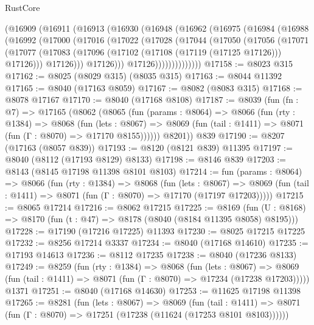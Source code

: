 \begin{lexlean}{RustCore}
\begin{coremodule}
      (@16909
        (@16911
          (@16913
            (@16930
              (@16948
                (@16962
                  (@16975
                    (@16984
                      (@16988
                        (@16992
                          (@17000
                            (@17016
                              (@17022
                                (@17028
                                  (@17044
                                    (@17050
                                      (@17056
                                        (@17071
                                          (@17077
                                            (@17083
                                              (@17096
                                                (@17102 (@17108 (@17119 (@17125 @17126))) @17126)))
                                            @17126)))
                                      @17126)))
                                @17126))))))))))))))
@17158 := @8023 @315
@17162 := @8025 (@8029 @315) (@8035 @315)
@17163 := @8044 @11392
@17165 := @8040 (@17163 @8059)
@17167 := @8082 (@8083 @315)
@17168 := @8078 @17167
@17170 := @8040 (@17168 @8108)
@17187 := @8039
    (fun (fn : @7) =>
    @17165
      (@8062
        (@8065
          (fun (params : @8064) =>
          @8066
            (fun (rty : @1384) =>
            @8068
              (fun (lets : @8067) =>
              @8069 (fun (tail : @1411) => @8071 (fun (Γ : @8070) => @17170 @8155))))))
        @8201))
    @839
@17190 := @8207 (@17163 (@8057 @839))
@17193 := @8120 (@8121 @839) @11395
@17197 := @8040 (@8112 (@17193 @8129) @8133)
@17198 := @8146 @839
@17203 := @8143 (@8145 @17198 @11398 @8101 @8103)
@17214 := fun (params : @8064) =>
  @8066
    (fun (rty : @1384) =>
    @8068
      (fun (lets : @8067) =>
      @8069 (fun (tail : @1411) => @8071 (fun (Γ : @8070) => @17170 (@17197 @17203)))))
@17215 := @8065 @17214
@17216 := @8062 @17215
@17225 := @8169
    (fun (U : @8168) => @8170 (fun (t : @47) => @8178 (@8040 (@8184 @11395 @8058) @8195)))
@17228 := @17190 (@17216 @17225) @11393
@17230 := @8025 @17215 @17225
@17232 := @8256 @17214 @3337
@17234 := @8040 (@17168 @14610)
@17235 := @17193 @14613
@17236 := @8112 @17235
@17238 := @8040 (@17236 @8133)
@17249 := @8259
    (fun (rty : @1384) =>
    @8068
      (fun (lets : @8067) =>
      @8069 (fun (tail : @1411) => @8071 (fun (Γ : @8070) => @17234 (@17238 @17203)))))
    @1371
@17251 := @8040 (@17168 @14630)
@17253 := @11625 @17198 @11398
@17265 := @8281
    (fun (lets : @8067) =>
    @8069
      (fun (tail : @1411) =>
      @8071 (fun (Γ : @8070) => @17251 (@17238 (@11624 (@17253 @8101 @8103))))))

\end{coremodule}
\end{lexlean}
